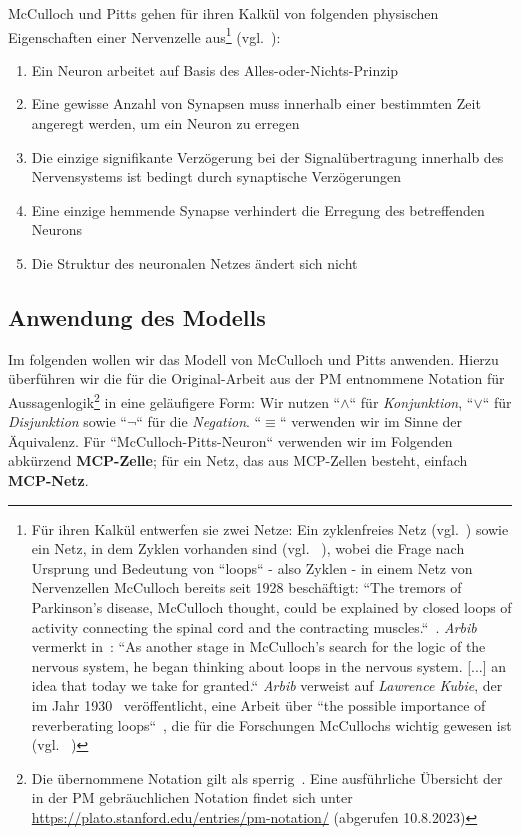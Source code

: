 McCulloch und Pitts gehen für ihren Kalkül von folgenden physischen Eigenschaften einer Nervenzelle aus\footnote{
    Für ihren Kalkül entwerfen sie zwei Netze: Ein zyklenfreies Netz (vgl.~\cite[101]{MP43}) sowie ein Netz, in dem Zyklen vorhanden sind (vgl. ~\cite[108]{MP43}), wobei
    die Frage nach Ursprung und Bedeutung von ``loops`` - also Zyklen - in einem Netz von Nervenzellen McCulloch bereits seit 1928 beschäftigt: ``The tremors of Parkinson’s disease, McCulloch thought, could be explained by closed loops of activity connecting the spinal cord and the contracting muscles.``~\cite[178]{Pic04}. \textit{Arbib} vermerkt in~\cite[3]{Arb19}: ``As another stage in McCulloch's search for the logic of the nervous system, he began thinking about loops in the nervous system. [...] an idea that today we take for granted.`` \textit{Arbib} verweist auf \textit{Lawrence Kubie}, der im Jahr 1930~\cite{Kub30} veröffentlicht, eine Arbeit über ``the possible importance of reverberating loops``~\cite[5]{Arb19}, die für die Forschungen McCullochs wichtig gewesen ist (vgl. ~\cite[5]{Arb19})
} (vgl.~\cite[101]{MP43}):


\begin{enumerate}
    \item Ein Neuron arbeitet auf Basis des Alles-oder-Nichts-Prinzip
    \item Eine gewisse Anzahl von Synapsen muss innerhalb einer bestimmten Zeit angeregt werden, um ein Neuron zu erregen
    \item Die einzige signifikante Verzögerung bei der Signalübertragung innerhalb des Nervensystems ist bedingt durch synaptische Verzögerungen
    \item Eine einzige hemmende Synapse verhindert die Erregung des betreffenden Neurons
    \item Die Struktur des neuronalen Netzes ändert sich nicht
\end{enumerate}


\subsection{Anwendung des Modells}

Im folgenden wollen wir das Modell von McCulloch und Pitts anwenden.
Hierzu überführen wir die für die Original-Arbeit aus der PM entnommene Notation für Aussagenlogik\footnote{
    Die übernommene Notation gilt als sperrig~\cite[16]{AR88}. Eine ausführliche Übersicht der in der PM gebräuchlichen Notation findet sich unter \url{https://plato.stanford.edu/entries/pm-notation/} (abgerufen 10.8.2023)
} in eine geläufigere Form: Wir nutzen ``$\land$`` für \textit{Konjunktion}, ``$\lor$`` für \textit{Disjunktion} sowie ``$\neg$`` für die \textit{Negation}.
``$\equiv$`` verwenden wir im Sinne der Äquivalenz.
Für ``McCulloch-Pitts-Neuron`` verwenden wir im Folgenden abkürzend \textbf{MCP-Zelle}; für ein Netz, das aus MCP-Zellen besteht, einfach \textbf{MCP-Netz}.\\

